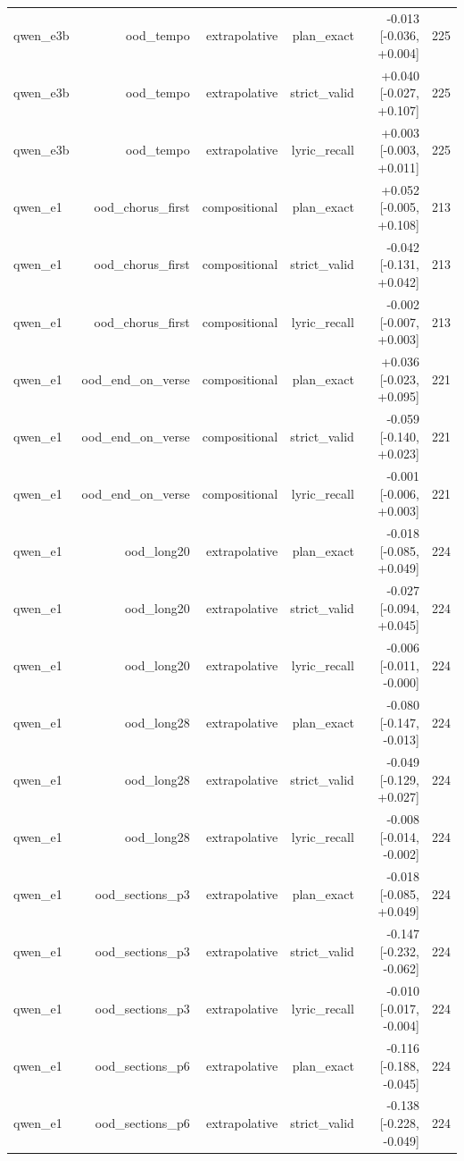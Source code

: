 \begin{table}[t]
\begin{tabular}{lrrrrr}
qwen\_e3b & ood\_tempo & extrapolative & plan\_exact & -0.013 [-0.036, +0.004] & 225 \\
qwen\_e3b & ood\_tempo & extrapolative & strict\_valid & +0.040 [-0.027, +0.107] & 225 \\
qwen\_e3b & ood\_tempo & extrapolative & lyric\_recall & +0.003 [-0.003, +0.011] & 225 \\
qwen\_e1 & ood\_chorus\_first & compositional & plan\_exact & +0.052 [-0.005, +0.108] & 213 \\
qwen\_e1 & ood\_chorus\_first & compositional & strict\_valid & -0.042 [-0.131, +0.042] & 213 \\
qwen\_e1 & ood\_chorus\_first & compositional & lyric\_recall & -0.002 [-0.007, +0.003] & 213 \\
qwen\_e1 & ood\_end\_on\_verse & compositional & plan\_exact & +0.036 [-0.023, +0.095] & 221 \\
qwen\_e1 & ood\_end\_on\_verse & compositional & strict\_valid & -0.059 [-0.140, +0.023] & 221 \\
qwen\_e1 & ood\_end\_on\_verse & compositional & lyric\_recall & -0.001 [-0.006, +0.003] & 221 \\
qwen\_e1 & ood\_long20 & extrapolative & plan\_exact & -0.018 [-0.085, +0.049] & 224 \\
qwen\_e1 & ood\_long20 & extrapolative & strict\_valid & -0.027 [-0.094, +0.045] & 224 \\
qwen\_e1 & ood\_long20 & extrapolative & lyric\_recall & -0.006 [-0.011, -0.000] & 224 \\
qwen\_e1 & ood\_long28 & extrapolative & plan\_exact & -0.080 [-0.147, -0.013] & 224 \\
qwen\_e1 & ood\_long28 & extrapolative & strict\_valid & -0.049 [-0.129, +0.027] & 224 \\
qwen\_e1 & ood\_long28 & extrapolative & lyric\_recall & -0.008 [-0.014, -0.002] & 224 \\
qwen\_e1 & ood\_sections\_p3 & extrapolative & plan\_exact & -0.018 [-0.085, +0.049] & 224 \\
qwen\_e1 & ood\_sections\_p3 & extrapolative & strict\_valid & -0.147 [-0.232, -0.062] & 224 \\
qwen\_e1 & ood\_sections\_p3 & extrapolative & lyric\_recall & -0.010 [-0.017, -0.004] & 224 \\
qwen\_e1 & ood\_sections\_p6 & extrapolative & plan\_exact & -0.116 [-0.188, -0.045] & 224 \\
qwen\_e1 & ood\_sections\_p6 & extrapolative & strict\_valid & -0.138 [-0.228, -0.049] & 224 \\

\end{tabular}
\end{table}
